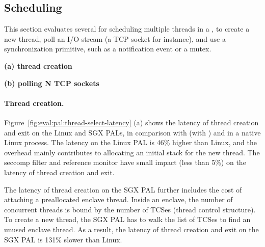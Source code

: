 \subsection{Scheduling}
\label{sec:eval:pal:sched}

This section evaluates several \hostapis{} for scheduling multiple threads
in a \picoproc{},
to create a new thread,
poll an I/O stream (a TCP socket for instance),
and use a synchronization primitive,
such as a notification event or a mutex. 


\begin{figure*}[t!]
\centering
\footnotesize
{}
\parbox{0.49\textwidth}{\centering\bf (a) thread creation}
\parbox{0.49\textwidth}{\centering\bf (b) polling N TCP sockets}
\caption{(a) Thread creation latency and (b) latency of polling a number of TCP sockets.
Lower is better.
The comparison is between (1)  and  on Linux; (2)  and  on the Linux PAL, with and without a \seccomp{} filter ({\bf +SC}) and reference monitor ({\bf +RM}); (3) the same \hostapis{} on the SGX PAL.}
\label{fig:eval:pal:thread-select-latency}
\end{figure*}


\paragraph{Thread creation.}
Figure~\ref{fig:eval:pal:thread-select-latency} (a)
shows the latency of thread creation and exit
on the Linux and SGX PALs,
in comparison with 
 (with )
and  in a native Linux process.
The latency on the Linux PAL is
\roughly{}46\% higher
than Linux,
and the overhead mainly contributes
to allocating an initial stack for the new thread. %
The seccomp{} filter and reference monitor
have small impact (less than 5\%)
on the latency of thread creation and exit.


The latency of thread creation on the SGX PAL further includes
the cost of attaching a preallocated enclave thread.
Inside an enclave,
the number of concurrent threads is bound by the number
of TCSes (thread control structure).
To create a new thread,
the SGX PAL has to walk the list of TCSes
to find an unused enclave thread.
As a result, the latency of thread creation and exit on the SGX PAL is \roughly{}131\% slower than Linux.





